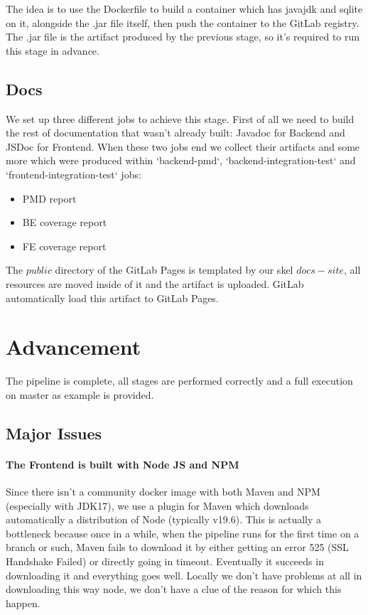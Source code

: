 \documentclass[a4paper,10pt]{scrartcl}
\begin{document}
The idea is to use the Dockerfile to build a container which has javajdk and sqlite on it, alongside the .jar file itself, then push the container to the GitLab registry. The .jar file is the artifact produced by the previous stage, so it's required to run this stage in advance.

\subsection{Docs}

We set up three different jobs to achieve this stage. First of all we need to build the rest of documentation that wasn't already built: Javadoc for Backend and JSDoc for Frontend. When these two jobs end we collect their artifacts and some more which were produced within `backend-pmd`, `backend-integration-test` and `frontend-integration-test` jobs:
\begin{itemize}
    \item PMD report
    \item BE coverage report
    \item FE coverage report
\end{itemize}

The $public$ directory of the GitLab Pages is templated by our skel $docs-site$, all resources are moved inside of it and the artifact is uploaded. GitLab automatically load this artifact to GitLab Pages.

\section{Advancement}

The pipeline is complete, all stages are performed correctly and a full execution on master as example is provided.

\subsection{Major Issues}

\paragraph{The Frontend is built with Node JS and NPM}

Since there isn't a community docker image with both Maven and NPM (especially with JDK17), we use a plugin for Maven which downloads automatically a distribution of Node (typically v19.6). This is actually a bottleneck because once in a while, when the pipeline runs for the first time on a branch or such, Maven fails to download it by either getting an error 525 (SSL Handshake Failed) or directly going in timeout. Eventually it succeeds in downloading it and everything goes well. Locally we don't have problems at all in downloading this way node, we don't have a clue of the reason for which this happen.
\end{document}

